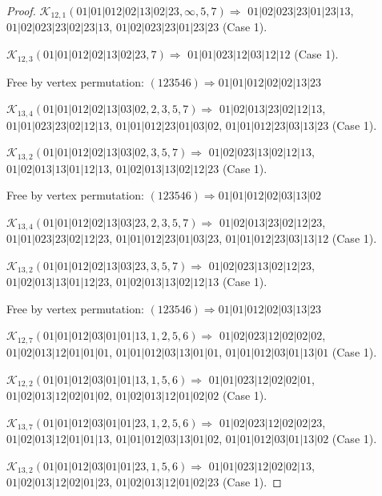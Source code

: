 \documentclass[12pt]{article}
\theoremstyle{plain}
\theoremstyle{definition}
\theoremstyle{remark}
\newcommand{\fancy}[1]{\mathcal{#1}}
\def\K{\fancy{K}}
\begin{document}
\begin{proof}
	$\K_{12,1}(01|01|012|02|13|02|23,\infty,5, 7)\Rightarrow $ $01|02|023|23|01|23|13$, $01|02|023|23|02|23|13$, $01|02|023|23|01|23|23$ (Case 1).
	
	$\K_{12,3}(01|01|012|02|13|02|23,7)\Rightarrow $ $01|01|023|12|03|12|12$ (Case 1).
	
	
	
	Free by vertex permutation: $(1 2 3 5 4 6)\Rightarrow 01|01|012|02|02|13|23$
	
	
	
	\bigskip
	
	$\K_{13,4}(01|01|012|02|13|03|02,2, 3, 5, 7)\Rightarrow $ $01|02|013|23|02|12|13$, $01|01|023|23|02|12|13$, $01|01|012|23|01|03|02$, $01|01|012|23|03|13|23$ (Case 1).
	
	$\K_{13,2}(01|01|012|02|13|03|02,3, 5, 7)\Rightarrow $ $01|02|023|13|02|12|13$, $01|02|013|13|01|12|13$, $01|02|013|13|02|12|23$ (Case 1).
	
	
	
	Free by vertex permutation: $(1 2 3 5 4 6)\Rightarrow 01|01|012|02|03|13|02$
	
	
	
	\bigskip
	
	$\K_{13,4}(01|01|012|02|13|03|23,2, 3, 5, 7)\Rightarrow $ $01|02|013|23|02|12|23$, $01|01|023|23|02|12|23$, $01|01|012|23|01|03|23$, $01|01|012|23|03|13|12$ (Case 1).
	
	$\K_{13,2}(01|01|012|02|13|03|23,3, 5, 7)\Rightarrow $ $01|02|023|13|02|12|23$, $01|02|013|13|01|12|23$, $01|02|013|13|02|12|13$ (Case 1).
	
	
	
	Free by vertex permutation: $(1 2 3 5 4 6)\Rightarrow 01|01|012|02|03|13|23$
	
	
	
	\bigskip
	
	$\K_{12,7}(01|01|012|03|01|01|13,1, 2, 5, 6)\Rightarrow $ $01|02|023|12|02|02|02$, $01|02|013|12|01|01|01$, $01|01|012|03|13|01|01$, $01|01|012|03|01|13|01$ (Case 1).
	
	$\K_{12,2}(01|01|012|03|01|01|13,1, 5, 6)\Rightarrow $ $01|01|023|12|02|02|01$, $01|02|013|12|02|01|02$, $01|02|013|12|01|02|02$ (Case 1).
	
	
	\bigskip
	
	$\K_{13,7}(01|01|012|03|01|01|23,1, 2, 5, 6)\Rightarrow $ $01|02|023|12|02|02|23$, $01|02|013|12|01|01|13$, $01|01|012|03|13|01|02$, $01|01|012|03|01|13|02$ (Case 1).
	
	$\K_{13,2}(01|01|012|03|01|01|23,1, 5, 6)\Rightarrow $ $01|01|023|12|02|02|13$, $01|02|013|12|02|01|23$, $01|02|013|12|01|02|23$ (Case 1).
	

\end{proof}
\end{document}
